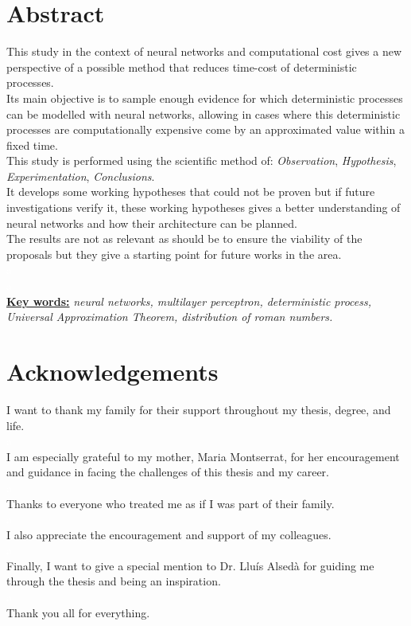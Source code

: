 \documentclass[a4paper, 11pt]{article}
\begin{document}
\section*{Abstract}
This study in the context of neural networks and computational cost gives a new perspective of a possible method that reduces time-cost of deterministic processes.\\
Its main objective is to sample enough evidence for which deterministic processes can be modelled with neural networks, allowing in cases where this deterministic processes are computationally expensive come by an approximated value within a fixed time.\\
This study is performed using the scientific method of: \textit{Observation}, \textit{Hypothesis}, \textit{Experimentation}, \textit{Conclusions}.\\
It develops some working hypotheses that could not be proven but if future investigations verify it, these working hypotheses gives a better understanding of neural networks and how their architecture can be planned.\\
The results are not as relevant as should be to ensure the viability of the proposals but they give a starting point for future works in the area.\\
\textcolor{white}{a}\\
\textcolor{white}{a}\\
\underline{\textbf{Key words:}} \textit{neural networks, multilayer perceptron, deterministic process, Universal Approximation Theorem, distribution of roman numbers.}

\newpage
\section*{Acknowledgements}
I want to thank my family for their support throughout my thesis, degree, and life.\\
\textcolor{white}{a}\\
I am especially grateful to my mother, Maria Montserrat, for her encouragement and guidance in facing the challenges of this thesis and my career.\\
\textcolor{white}{a}\\
Thanks to everyone who treated me as if I was part of their family.\\
\textcolor{white}{a}\\
I also appreciate the encouragement and support of my colleagues.\\
\textcolor{white}{a}\\
Finally, I want to give a special mention to Dr. Lluís Alsedà for guiding me through the thesis and being an inspiration.\\
\textcolor{white}{a}\\
Thank you all for everything.
\newpage
\end{document}
